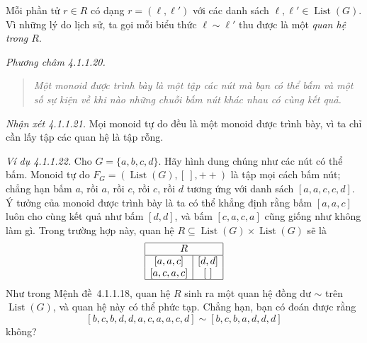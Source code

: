 Mỗi phần tử $r\in R$ có dạng $r=(\ell,\ell')$ với các danh sách $\ell,\ell'\in\operatorname{List}(G)$. Vì những lý do lịch sử, ta gọi mỗi biểu thức $\ell\sim\ell'$ thu được là một \emph{quan hệ trong $R$}.

\noindent\textit{Phương châm 4.1.1.20.}\keepwithnext
\begin{quote}\emph{Một monoid được trình bày là một tập các nút mà bạn có thể bấm và một số sự kiện về khi nào những chuỗi bấm nút khác nhau có cùng kết quả.}\end{quote}

\noindent\textit{Nhận xét 4.1.1.21.} Mọi monoid tự do đều là một monoid được trình bày, vì ta chỉ cần lấy tập các quan hệ là tập rỗng.

\noindent\textit{Ví dụ 4.1.1.22.} Cho $G=\{a,b,c,d\}$. Hãy hình dung chúng như các nút có thể bấm. Monoid tự do $F_G=(\operatorname{List}(G),[\ ],\mathbin{+\!+})$ là tập mọi cách bấm nút; chẳng hạn bấm $a$, rồi $a$, rồi $c$, rồi $c$, rồi $d$ tương ứng với danh sách $[a,a,c,c,d]$. Ý tưởng của monoid được trình bày là ta có thể khẳng định rằng bấm $[a,a,c]$ luôn cho cùng kết quả như bấm $[d,d]$, và bấm $[c,a,c,a]$ cũng giống như không làm gì. Trong trường hợp này, quan hệ $R\subseteq\operatorname{List}(G)\times\operatorname{List}(G)$ sẽ là
\[
\begin{array}{|c|c|}\hline
\multicolumn{2}{|c|}{R}\\\hline
{}[a,a,c]&[d,d]\\
{}[a,c,a,c]&[\ ]\\\hline
\end{array}
\]
Như trong Mệnh đề~4.1.1.18, quan hệ $R$ sinh ra một quan hệ đồng dư $\sim$ trên $\operatorname{List}(G)$, và quan hệ này có thể phức tạp. Chẳng hạn, bạn có đoán được rằng
\[
[b,c,b,d,d,a,c,a,a,c,d]\sim
[b,c,b,a,d,d,d]
\]
không?
